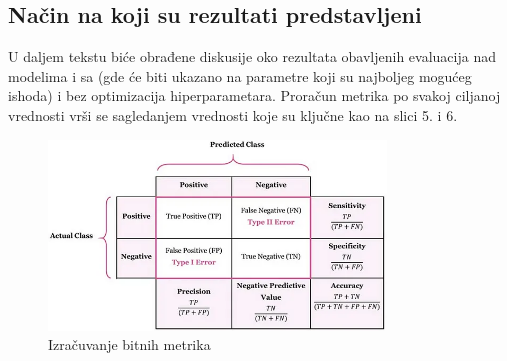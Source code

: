 \documentclass[fontsize=12bp, paper=a4]{scrarticle}
\begin{document}
\subsection{Način na koji su rezultati predstavljeni}
U daljem tekstu biće obrađene diskusije oko rezultata obavljenih evaluacija nad modelima i sa (gde će biti ukazano na parametre koji su najboljeg mogućeg ishoda) i bez optimizacija hiperparametara. Proračun metrika po svakoj ciljanoj vrednosti vrši se sagledanjem vrednosti koje su ključne kao na slici 5. i 6. 
\begin{figure}[h]
    \centering
    \includegraphics[width=0.8\textwidth]{2.png}
    \caption{\centering Izračuvanje bitnih metrika}
\end{figure}
\end{document}
